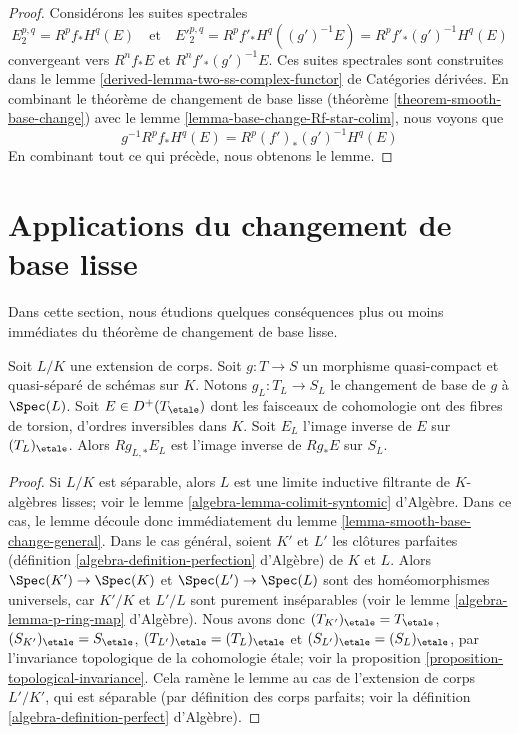 \begin{proof}
Considérons les suites spectrales
$$
E_2^{p, q} = R^pf_*H^q(E)
\quad\text{et}\quad
{E'}_2^{p, q} = R^pf'_*H^q((g')^{-1}E) = R^pf'_*(g')^{-1}H^q(E)
$$
convergeant vers $R^nf_*E$ et $R^nf'_*(g')^{-1}E$.
Ces suites spectrales sont construites dans le
lemme \ref{derived-lemma-two-ss-complex-functor} de Catégories dérivées.
En combinant le théorème de changement de base lisse
(théorème \ref{theorem-smooth-base-change})
avec le lemme \ref{lemma-base-change-Rf-star-colim}, nous voyons que
$$
g^{-1}R^pf_*H^q(E) = R^p(f')_*(g')^{-1}H^q(E)
$$
En combinant tout ce qui précède, nous obtenons le lemme.
\end{proof}












\section{Applications du changement de base lisse}
\label{section-applications-smooth-base-change}

\noindent
Dans cette section, nous étudions quelques conséquences plus ou moins immédiates
du théorème de changement de base lisse.

\begin{lemma}
\label{lemma-base-change-field-extension}
Soit $L/K$ une extension de corps. Soit $g : T \to S$ un morphisme quasi-compact
et quasi-séparé de schémas sur $K$. Notons
$g_L : T_L \to S_L$ le changement de base de $g$ à $\Spec(L)$.
Soit $E \in D^+(T_\etale)$ dont les faisceaux de cohomologie ont des fibres
de torsion, d'ordres inversibles dans $K$. Soit $E_L$ l'image
inverse de $E$ sur $(T_L)_\etale$. Alors
$Rg_{L, *}E_L$ est l'image inverse de $Rg_*E$ sur $S_L$.
\end{lemma}

\begin{proof}
Si $L/K$ est séparable, alors $L$ est une limite inductive filtrante de
$K$-algèbres lisses; voir le
lemme \ref{algebra-lemma-colimit-syntomic} d'Algèbre.
Dans ce cas, le lemme découle donc immédiatement du
lemme \ref{lemma-smooth-base-change-general}.
Dans le cas général, soient $K'$ et $L'$ les clôtures parfaites
(définition \ref{algebra-definition-perfection} d'Algèbre)
de $K$ et $L$. Alors $\Spec(K') \to \Spec(K)$ et
$\Spec(L') \to \Spec(L)$ sont des homéomorphismes universels,
car $K'/K$ et $L'/L$ sont purement inséparables
(voir le lemme \ref{algebra-lemma-p-ring-map} d'Algèbre).
Nous avons donc $(T_{K'})_\etale = T_\etale$,
$(S_{K'})_\etale = S_\etale$,
$(T_{L'})_\etale = (T_L)_\etale$ et
$(S_{L'})_\etale = (S_L)_\etale$, par
l'invariance topologique de la cohomologie étale; voir la
proposition \ref{proposition-topological-invariance}.
Cela ramène le lemme au cas de l'extension de corps
$L'/K'$, qui est séparable (par définition des
corps parfaits; voir la définition \ref{algebra-definition-perfect} d'Algèbre).
\end{proof}


